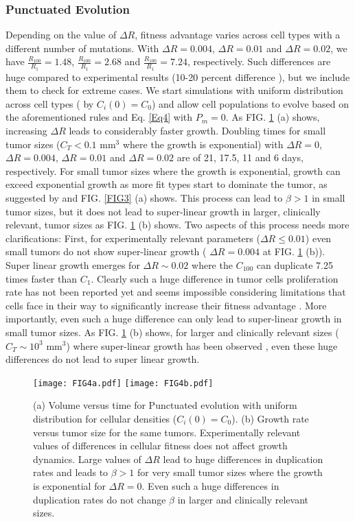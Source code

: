 \documentclass[aps,prl, superscriptaddress,groupedaddress]{revtex4}  %
\begin{document}
	\subsubsection{Punctuated Evolution} 
 Depending on the value of $\Delta R$, fitness advantage varies across cell types with a different number of mutations. With $\Delta R=0.004$, $\Delta R=0.01$ and $\Delta R=0.02$, we have $\frac{R_{100} }{R_1}=1.48$,  $\frac{R_{100}}{R_1}=2.68$ and $\frac{R_{100}}{R_1}=7.24$, respectively. Such differences are huge compared to experimental results (10-20 percent difference \cite{heide2018reply}), but we include them to check for extreme cases. We start simulations with uniform distribution across cell types ( by $C_i (0)= C_0$)  and allow cell populations to evolve based on the aforementioned rules and Eq. \ref{Eq4} with $P_m=0$. As FIG. \ref{FIG4} (a) shows, increasing $\Delta R$ leads to considerably faster growth. Doubling times for small tumor sizes ($C_T < 0.1 $ mm$^3$ where the growth is exponential) with $\Delta R=0$, $\Delta R=0.004$, $\Delta R=0.01$ and $\Delta R=0.02$ are of 21,  17.5, 11  and 6 days, respectively. For small tumor sizes where the growth is exponential, growth can exceed exponential growth as more fit types start to dominate the tumor, as suggested by \cite{durrett2010evolutionary} and FIG. \ref{FIG3} (a) shows.  This process can lead to $\beta>1$ in small tumor sizes, but it does not lead to super-linear growth in larger, clinically relevant, tumor sizes as FIG. \ref{FIG4} (b) shows.  Two aspects of this process needs more clarifications: First, for experimentally relevant parameters ($\Delta R \le 0.01$) even small tumors do not show super-linear growth ( $\Delta R=0.004$ at FIG. \ref{FIG4} (b)). Super linear growth emerges for $\Delta R \sim  0.02$ where the $C_100$ can duplicate 7.25 times faster than $C_1$. Clearly such a huge difference in tumor cells proliferation rate has not been reported yet and seems impossible considering limitations that cells face in their way to significantly increase their fitness advantage \cite{hausser2020tumour}. More importantly, even such a huge difference can only lead to super-linear growth in small tumor sizes. As FIG. \ref{FIG4} (b) shows, for larger and clinically relevant sizes ($C_T \sim 10^3$ mm$^3$) where super-linear growth has been observed \cite{Victor2020superlinear}, even these huge differences do not lead to super linear growth. 
	
	\begin{figure} 
		\centering
		\texttt{[image: FIG4a.pdf]}  
		\texttt{[image: FIG4b.pdf]} 
		\caption{  (a) Volume versus time for Punctuated evolution with uniform distribution for cellular densities ($C_i(0)= C_0$). (b) Growth rate versus tumor size for the same tumors.  Experimentally relevant values of differences in cellular fitness does not affect growth dynamics. Large  values of $\Delta R$ lead to huge differences in duplication rates and leads to $\beta>1$ for very small tumor sizes where the growth is exponential for $\Delta R=0$. Even such  a huge differences in duplication rates do not change $\beta$ in larger and clinically relevant sizes.   }
		\label{FIG4}
	\end{figure} 
	
\end{document}
